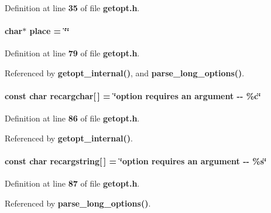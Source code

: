 Definition at line {\bf 35} of file {\bf getopt.\+h}.

\paragraph[{place}]{\setlength{\rightskip}{0pt plus 5cm}char$\ast$ place = \char`\"{}\char`\"{}\hspace{0.3cm}{\ttfamily [static]}}\label{soapysdr_2apps_2msvc_2getopt_8h_a8671bb5de7c967469d95cf71b4ae06cd}


Definition at line {\bf 79} of file {\bf getopt.\+h}.



Referenced by {\bf getopt\+\_\+internal()}, and {\bf parse\+\_\+long\+\_\+options()}.

\paragraph[{recargchar}]{\setlength{\rightskip}{0pt plus 5cm}const char recargchar[$\,$] = \char`\"{}option requires an argument -\/-\/ \%{\bf c}\char`\"{}\hspace{0.3cm}{\ttfamily [static]}}\label{soapysdr_2apps_2msvc_2getopt_8h_ad4baf3be33fb50c0f2015b8821ed9398}


Definition at line {\bf 86} of file {\bf getopt.\+h}.



Referenced by {\bf getopt\+\_\+internal()}.

\paragraph[{recargstring}]{\setlength{\rightskip}{0pt plus 5cm}const char recargstring[$\,$] = \char`\"{}option requires an argument -\/-\/ \%s\char`\"{}\hspace{0.3cm}{\ttfamily [static]}}\label{soapysdr_2apps_2msvc_2getopt_8h_a2b3c29bd6cb47d564ec2f12b6c6a8790}


Definition at line {\bf 87} of file {\bf getopt.\+h}.



Referenced by {\bf parse\+\_\+long\+\_\+options()}.


